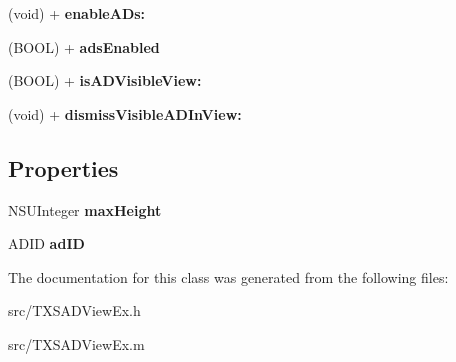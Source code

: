 \begin{DoxyCompactItemize}
\item 
\hypertarget{interface_t_x_s_a_d_view_ex_a431713114e2778dbc277121aaae779ea}{}(void) + {\bfseries enable\+A\+Ds\+:}\label{interface_t_x_s_a_d_view_ex_a431713114e2778dbc277121aaae779ea}

\item 
\hypertarget{interface_t_x_s_a_d_view_ex_a8d096203afcd90c005486f5f3f110b59}{}(B\+O\+O\+L) + {\bfseries ads\+Enabled}\label{interface_t_x_s_a_d_view_ex_a8d096203afcd90c005486f5f3f110b59}

\item 
\hypertarget{interface_t_x_s_a_d_view_ex_a6cdb5ba9f262d33a10712dd8367ce01f}{}(B\+O\+O\+L) + {\bfseries is\+A\+D\+Visible\+View\+:}\label{interface_t_x_s_a_d_view_ex_a6cdb5ba9f262d33a10712dd8367ce01f}

\item 
\hypertarget{interface_t_x_s_a_d_view_ex_a3bfc243300e916de54f54fa4201e6e96}{}(void) + {\bfseries dismiss\+Visible\+A\+D\+In\+View\+:}\label{interface_t_x_s_a_d_view_ex_a3bfc243300e916de54f54fa4201e6e96}

\end{DoxyCompactItemize}
\subsection*{Properties}
\begin{DoxyCompactItemize}
\item 
\hypertarget{interface_t_x_s_a_d_view_ex_af1faea68c8f1c45cdd6a81b45a3ff645}{}N\+S\+U\+Integer {\bfseries max\+Height}\label{interface_t_x_s_a_d_view_ex_af1faea68c8f1c45cdd6a81b45a3ff645}

\item 
\hypertarget{interface_t_x_s_a_d_view_ex_a190546444d77b96861f4e319177c03cb}{}A\+D\+I\+D {\bfseries ad\+I\+D}\label{interface_t_x_s_a_d_view_ex_a190546444d77b96861f4e319177c03cb}

\end{DoxyCompactItemize}


The documentation for this class was generated from the following files\+:\begin{DoxyCompactItemize}
\item 
src/T\+X\+S\+A\+D\+View\+Ex.\+h\item 
src/T\+X\+S\+A\+D\+View\+Ex.\+m\end{DoxyCompactItemize}
